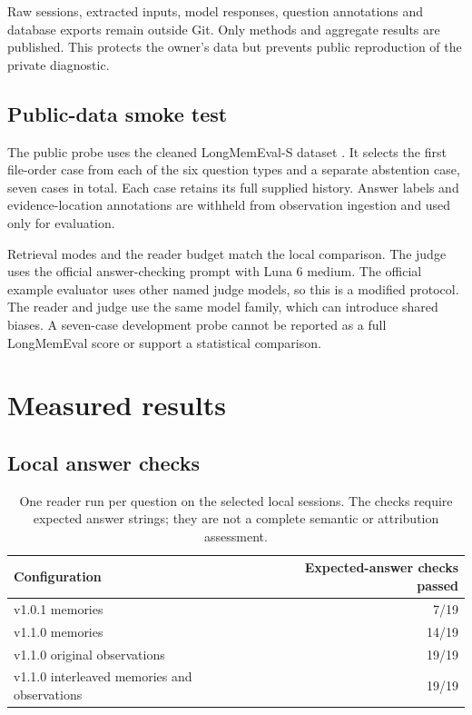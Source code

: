 \documentclass[11pt]{article}
\begin{document}
Raw sessions, extracted inputs, model responses, question annotations and database exports remain outside Git. Only methods and aggregate results are published. This protects the owner's data but prevents public reproduction of the private diagnostic.

\subsection{Public-data smoke test}
The public probe uses the cleaned LongMemEval-S dataset \cite{longmem,benchmark}. It selects the first file-order case from each of the six question types and a separate abstention case, seven cases in total. Each case retains its full supplied history. Answer labels and evidence-location annotations are withheld from observation ingestion and used only for evaluation.

Retrieval modes and the reader budget match the local comparison. The judge uses the official answer-checking prompt with Luna 6 medium. The official example evaluator uses other named judge models, so this is a modified protocol. The reader and judge use the same model family, which can introduce shared biases. A seven-case development probe cannot be reported as a full LongMemEval score or support a statistical comparison.

\section{Measured results}
\subsection{Local answer checks}
\begin{table}[h]
\centering
\begin{tabular}{lr}
\toprule
Configuration & Expected-answer checks passed\\
\midrule
v1.0.1 memories & 7/19\\
v1.1.0 memories & 14/19\\
v1.1.0 original observations & 19/19\\
v1.1.0 interleaved memories and observations & 19/19\\
\bottomrule
\end{tabular}
\caption{One reader run per question on the selected local sessions. The checks require expected answer strings; they are not a complete semantic or attribution assessment.}
\end{table}
\end{document}
